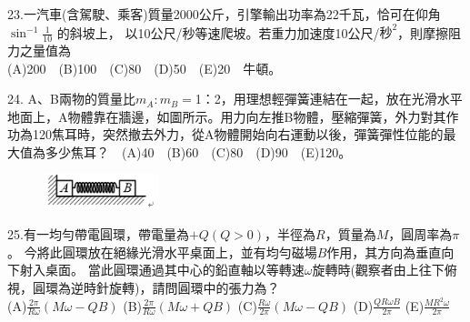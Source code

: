 \documentclass[cn,10pt,math=newtx]{elegantbook}
\begin{document}
\newpage


\begin{example}
  23.一汽車(含駕駛、乘客)質量2000公斤，引擎輸出功率為22千瓦，恰可在仰角$\sin^{-1}{\frac{1}{10}}$ 的斜坡上，
  以10公尺/秒等速爬坡。若重力加速度10公尺/$秒^2$，則摩擦阻力之量值為\\
  (A)200　(B)100　(C)80　(D)50　(E)20　牛頓。
\\
    \rightline{[成德高中教甄109]}
\end{example}
\begin{solution}
    
\end{solution}

\newpage


\begin{example}
   24. A、B兩物的質量比$m_A:m_B=$1：2，用理想輕彈簧連結在一起，放在光滑水平地面上，A物體靠在牆邊，如圖所示。用力向左推B物體，壓縮彈簧，外力對其作功為120焦耳時，突然撤去外力，從A物體開始向右運動以後，彈簧彈性位能的最大值為多少焦耳？　(A)40　(B)60　(C)80　(D)90　(E)120。\\
    \rightline{[成德高中教甄109]}
\end{example}
\begin{solution}
    
\end{solution}
\begin{figure}[htbp]
    \flushright
    \includegraphics[width=0.3\textwidth]{image/109成德24.png}
  \end{figure}
\newpage



\begin{example}
   25.有一均勻帶電圓環，帶電量為$+Q(Q>0)$，半徑為$R$，質量為$M$，圓周率為$\pi$。
   今將此圓環放在絕緣光滑水平桌面上，並有均勻磁場$B$作用，其方向為垂直向下射入桌面。
   當此圓環通過其中心的鉛直軸以等轉速$\omega$旋轉時(觀察者由上往下俯視，圓環為逆時針旋轉)，請問圓環中的張力為？\\
   (A)$\frac{2\pi}{R\omega}(M\omega-QB)$ (B)$\frac{2\pi}{R\omega}(M\omega+QB)$ 
   (C)$\frac{R\omega}{2\pi}(M\omega-QB)$ (D)$\frac{QR\omega B}{2\pi}$ (E)$\frac{MR^2\omega}{2\pi}$
   \\
    \rightline{[成德高中教甄109]}
\end{example}
\begin{solution}
    
\end{solution}
\end{document}
